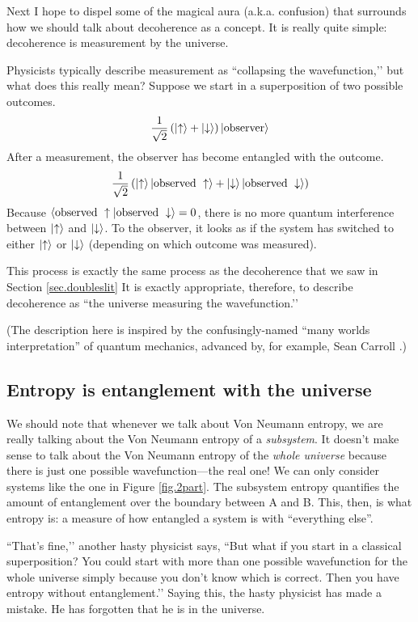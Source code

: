 Next I hope to dispel some of the magical aura (a.k.a. confusion) that surrounds how we should talk about decoherence as a concept. It is really quite simple: decoherence is measurement by the universe.

Physicists typically describe measurement as ``collapsing the wavefunction,’’ but what does this really mean? Suppose we start in a superposition of two possible outcomes.
\[
\frac{1}{\sqrt{2}}\left(\left|\uparrow\right\rangle + \left|\downarrow\right\rangle\right)\left|\text{observer}\right\rangle
\]
After a measurement, the observer has become entangled with the outcome.
\[
\frac{1}{\sqrt{2}}\left(\left|\uparrow\right\rangle\left|\text{observed }\uparrow\right\rangle + \left|\downarrow\right\rangle\left|\text{observed }\downarrow\right\rangle\right)
\]
Because \(\left\langle\text{observed }\uparrow|\text{observed }\downarrow\right\rangle=0\), there is no more quantum interference between \(\left|\uparrow\right\rangle\) and \(\left|\downarrow\right\rangle\). To the observer, it looks as if the system has switched to either \(\left|\uparrow\right\rangle\) or \(\left|\downarrow\right\rangle\) (depending on which outcome was measured).

This process is exactly the same process as the decoherence that we saw in Section \ref{sec.doubleslit} It is exactly appropriate, therefore, to describe decoherence as ``the universe measuring the wavefunction.’’

(The description here is inspired by the confusingly-named ``many worlds interpretation'' of quantum mechanics, advanced by, for example, Sean Carroll \cite{Carroll}.)

\subsection{Entropy is entanglement with the universe}

We should note that whenever we talk about Von Neumann entropy, we are really talking about the Von Neumann entropy of a \emph{subsystem}. It doesn’t make sense to talk about the Von Neumann entropy of the \emph{whole universe} because there is just one possible wavefunction—the real one! We can only consider systems like the one in Figure \ref{fig.2part}. The subsystem entropy quantifies the amount of entanglement over the boundary between A and B. This, then, is what entropy is: a measure of how entangled a system is with ``everything else''.

``That’s fine,’’ another hasty physicist says, ``But what if you start in a classical superposition? You could start with more than one possible wavefunction for the whole universe simply because you don’t know which is correct. Then you have entropy without entanglement.’’ Saying this, the hasty physicist has made a mistake. He has forgotten that he is in the universe.

